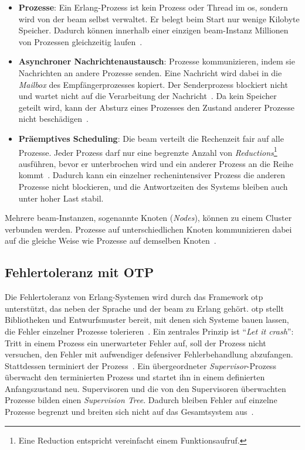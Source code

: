 \begin{itemize}
    \item \textbf{Prozesse}: Ein Erlang-Prozess ist kein Prozess oder Thread im \gls{os}, sondern wird von der \gls{beam} selbst verwaltet. Er belegt beim Start nur wenige Kilobyte Speicher. Dadurch können innerhalb einer einzigen \gls{beam}-Instanz Millionen von Prozessen gleichzeitig laufen~\citep{armstrong2003making, armstrong2007programming}.

    \item \textbf{Asynchroner Nachrichtenaustausch}: Prozesse kommunizieren, indem sie Nachrichten an andere Prozesse senden. Eine Nachricht wird dabei in die \textit{Mailbox} des Empfängerprozesses kopiert. Der Senderprozess blockiert nicht und wartet nicht auf die Verarbeitung der Nachricht~\citep{agha1986actors, armstrong2007programming}. Da kein Speicher geteilt wird, kann der Absturz eines Prozesses den Zustand anderer Prozesse nicht beschädigen~\citep{armstrong2003making, virding1996concurrent}.

    \item \textbf{Präemptives Scheduling}: Die \gls{beam} verteilt die Rechenzeit fair auf alle Prozesse. Jeder Prozess darf nur eine begrenzte Anzahl von \textit{Reductions}\footnote{Eine Reduction entspricht vereinfacht einem Funktionsaufruf.} ausführen, bevor er unterbrochen wird und ein anderer Prozess an die Reihe kommt~\citep{cesarini2009erlang, christakis2013systematic}. Dadurch kann ein einzelner rechenintensiver Prozess die anderen Prozesse nicht blockieren, und die Antwortzeiten des Systems bleiben auch unter hoher Last stabil.
\end{itemize}

Mehrere \gls{beam}-Instanzen, sogenannte Knoten (\textit{Nodes}), können zu einem Cluster verbunden werden. Prozesse auf unterschiedlichen Knoten kommunizieren dabei auf die gleiche Weise wie Prozesse auf demselben Knoten~\citep{armstrong2003making}.

\newpage

\subsection{Fehlertoleranz mit OTP}
\label{sub:grundlagen-otp}

Die Fehlertoleranz von Erlang-Systemen wird durch das Framework \gls{otp} unterstützt, das neben der Sprache und der \gls{beam} zu Erlang gehört. \gls{otp} stellt Bibliotheken und Entwurfsmuster bereit, mit denen sich Systeme bauen lassen, die Fehler einzelner Prozesse tolerieren~\citep{logan2011erlang}. Ein zentrales Prinzip ist \enquote{\textit{Let it crash}}: Tritt in einem Prozess ein unerwarteter Fehler auf, soll der Prozess nicht versuchen, den Fehler mit aufwendiger defensiver Fehlerbehandlung abzufangen. Stattdessen terminiert der Prozess~\citep{logan2011erlang}. Ein übergeordneter \textit{Supervisor}-Prozess überwacht den terminierten Prozess und startet ihn in einem definierten Anfangszustand neu. Supervisoren und die von den Supervisoren überwachten Prozesse bilden einen \textit{Supervision Tree}. Dadurch bleiben Fehler auf einzelne Prozesse begrenzt und breiten sich nicht auf das Gesamtsystem aus~\citep{logan2011erlang, armstrong2003making}.

